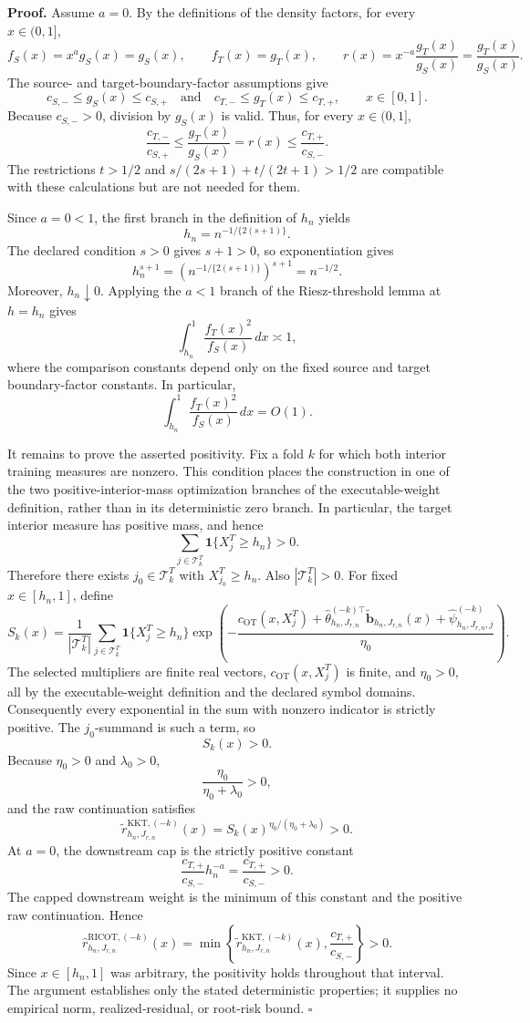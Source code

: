\textbf{Proof.}
Assume \(a=0\).  By the definitions of the density factors, for every \(x\in(0,1]\),
\[
 f_S(x)=x^a g_S(x)=g_S(x),
 \qquad
 f_T(x)=g_T(x),
 \qquad
 r(x)=x^{-a}\frac{g_T(x)}{g_S(x)}=\frac{g_T(x)}{g_S(x)}.
\]
The source- and target-boundary-factor assumptions give
\[
 c_{S,-}\le g_S(x)\le c_{S,+}
 \quad\text{and}\quad
 c_{T,-}\le g_T(x)\le c_{T,+},
 \qquad x\in[0,1].
\]
Because \(c_{S,-}>0\), division by \(g_S(x)\) is valid.  Thus, for every \(x\in(0,1]\),
\[
 \frac{c_{T,-}}{c_{S,+}}
 \le \frac{g_T(x)}{g_S(x)}
 =r(x)
 \le \frac{c_{T,+}}{c_{S,-}}.
\]
The restrictions \(t>1/2\) and \(s/(2s+1)+t/(2t+1)>1/2\) are compatible with these calculations but are not needed for them.

Since \(a=0<1\), the first branch in the definition of \(h_n\) yields
\[
 h_n=n^{-1/\{2(s+1)\}}.
\]
The declared condition \(s>0\) gives \(s+1>0\), so exponentiation gives
\[
 h_n^{s+1}
 =\left(n^{-1/\{2(s+1)\}}\right)^{s+1}
 =n^{-1/2}.
\]
Moreover, \(h_n\downarrow0\).  Applying the \(a<1\) branch of the Riesz-threshold lemma at \(h=h_n\) gives
\[
 \int_{h_n}^1\frac{f_T(x)^2}{f_S(x)}\,dx\asymp1,
\]
where the comparison constants depend only on the fixed source and target boundary-factor constants.  In particular,
\[
 \int_{h_n}^1\frac{f_T(x)^2}{f_S(x)}\,dx=O(1).
\]

It remains to prove the asserted positivity.  Fix a fold \(k\) for which both interior training measures are nonzero.  This condition places the construction in one of the two positive-interior-mass optimization branches of the executable-weight definition, rather than in its deterministic zero branch.  In particular, the target interior measure has positive mass, and hence
\[
 \sum_{j\in\mathcal T^T_k}\mathbf 1\{X_j^T\ge h_n\}>0.
\]
Therefore there exists \(j_0\in\mathcal T^T_k\) with \(X_{j_0}^T\ge h_n\).  Also \(|\mathcal T^T_k|>0\).  For fixed \(x\in[h_n,1]\), define
\[
 S_k(x)=\frac1{|\mathcal T^T_k|}
 \sum_{j\in\mathcal T^T_k}\mathbf 1\{X_j^T\ge h_n\}
 \exp\!\left(
 -\frac{c_{\mathrm{OT}}(x,X_j^T)
 +\widehat\theta_{h_n,J_{r,n}}^{(-k)\top}
       \widetilde{\mathbf b}_{h_n,J_{r,n}}(x)
 +\widehat\psi^{(-k)}_{h_n,J_{r,n},j}}
 {\eta_0}
 \right).
\]
The selected multipliers are finite real vectors, \(c_{\mathrm{OT}}(x,X_j^T)\) is finite, and \(\eta_0>0\), all by the executable-weight definition and the declared symbol domains.  Consequently every exponential in the sum with nonzero indicator is strictly positive.  The \(j_0\)-summand is such a term, so
\[
 S_k(x)>0.
\]
Because \(\eta_0>0\) and \(\lambda_0>0\),
\[
 \frac{\eta_0}{\eta_0+\lambda_0}>0,
\]
and the raw continuation satisfies
\[
 \widetilde r^{\mathrm{KKT},(-k)}_{h_n,J_{r,n}}(x)
 =S_k(x)^{\eta_0/(\eta_0+\lambda_0)}>0.
\]
At \(a=0\), the downstream cap is the strictly positive constant
\[
 \frac{c_{T,+}}{c_{S,-}}h_n^{-a}
 =\frac{c_{T,+}}{c_{S,-}}>0.
\]
The capped downstream weight is the minimum of this constant and the positive raw continuation.  Hence
\[
 \widehat r^{\mathrm{RICOT},(-k)}_{h_n,J_{r,n}}(x)
 =\min\!\left\{
 \widetilde r^{\mathrm{KKT},(-k)}_{h_n,J_{r,n}}(x),
 \frac{c_{T,+}}{c_{S,-}}
 \right\}>0.
\]
Since \(x\in[h_n,1]\) was arbitrary, the positivity holds throughout that interval.  The argument establishes only the stated deterministic properties; it supplies no empirical norm, realized-residual, or root-risk bound. \(\square\)